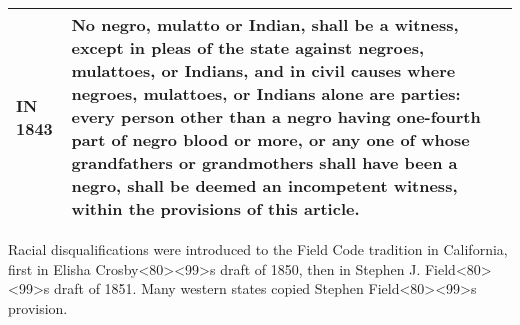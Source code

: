 \documentclass[12pt,]{article}
\begin{document}
\begin{longtable}[]{@{}ll@{}}
\begin{minipage}[t]{0.17\columnwidth}\raggedright
IN 1843\strut
\end{minipage} & \begin{minipage}[t]{0.77\columnwidth}\raggedright
No negro, mulatto or Indian, shall be a witness, except in pleas of the
state against negroes, mulattoes, or Indians, and in civil causes where
negroes, mulattoes, or Indians alone are parties: every person other
than a negro having one-fourth part of negro blood or more, or any one
of whose grandfathers or grandmothers shall have been a negro, shall be
deemed an incompetent witness, within the provisions of this
article.\strut
\end{minipage}\tabularnewline
\bottomrule
\end{longtable}

Racial disqualifications were introduced to the Field Code tradition in
California, first in Elisha
Crosby\textless80\textgreater\textless99\textgreater s draft of 1850,
then in Stephen J. Field\textless80\textgreater\textless99\textgreater s
draft of 1851. Many western states copied Stephen
Field\textless80\textgreater\textless99\textgreater s provision.
\end{document}
